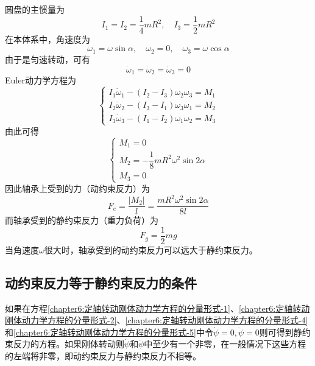 \begin{solution}
圆盘的主惯量为
\begin{equation*}
	I_1 = I_2 = \frac14 mR^2,\quad I_3 = \frac12 mR^2
\end{equation*}
在本体系中，角速度为
\begin{equation*}
	\omega_1 = \omega \sin \alpha,\quad \omega_2 = 0,\quad \omega_3 = \omega \cos \alpha
\end{equation*}
由于是匀速转动，可有
\begin{equation*}
	\dot{\omega}_1 = \dot{\omega}_2 = \dot{\omega}_3 = 0
\end{equation*}
Euler动力学方程为
\begin{equation*}
	\begin{cases}
		I_1 \dot{\omega}_1 - (I_2-I_3)\omega_2 \omega_3 = M_1 \\
		I_2 \dot{\omega}_2 - (I_3-I_1)\omega_3 \omega_1 = M_2 \\
		I_3 \dot{\omega}_3 - (I_1-I_2)\omega_1 \omega_2 = M_3
	\end{cases}
\end{equation*}
由此可得
\begin{equation*}
	\begin{cases}
		M_1 = 0 \\
		M_2 = -\dfrac18 mR^2 \omega^2 \sin 2\alpha \\ 
		M_3 = 0
	\end{cases}
\end{equation*}
因此轴承上受到的力（动约束反力）为
\begin{equation*}
	F_e = \frac{|M_2|}{l} = \frac{mR^2 \omega^2 \sin 2\alpha}{8l}
\end{equation*}
而轴承受到的静约束反力（重力负荷）为
\begin{equation*}
	F_g = \frac12 mg
\end{equation*}
当角速度$\omega$很大时，轴承受到的动约束反力可以远大于静约束反力。
\end{solution}

\subsection{动约束反力等于静约束反力的条件}

如果在方程\eqref{chapter6:定轴转动刚体动力学方程的分量形式-1}、\eqref{chapter6:定轴转动刚体动力学方程的分量形式-2}、\eqref{chapter6:定轴转动刚体动力学方程的分量形式-4}和\eqref{chapter6:定轴转动刚体动力学方程的分量形式-5}中令$\dot{\psi}=0,\ddot{\psi}=0$则可得到静约束反力的方程。如果刚体转动则$\dot{\psi}$和$\ddot{\psi}$中至少有一个非零，在一般情况下这些方程的左端将非零，即动约束反力与静约束反力不相等。

